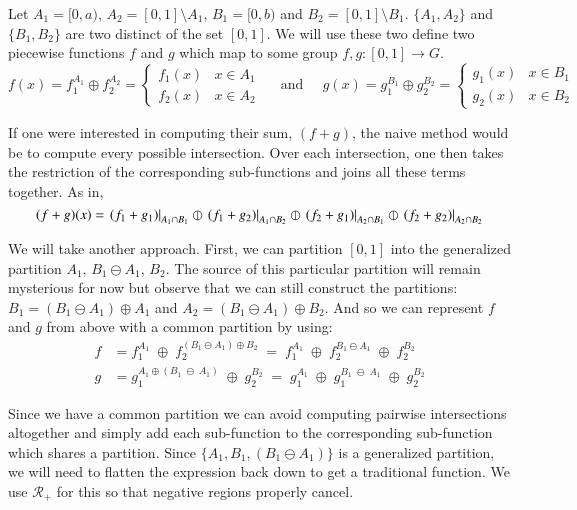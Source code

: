 Let $A_1 = [0,a)$, $A_2 = [0,1] \setminus A_1$, $B_1 = [0,b)$ and $B_2 = [0,1] \setminus B_1$.
$\{ A_1, A_2\}$ and $\{B_1, B_2\}$ are two distinct of the set $[0,1]$.
We will use these two define two piecewise functions $f$ and $g$ which map to some group $f,g:[0,1] \to G$.
\begin{equation*}
	f(x) = f_1^{A_1} \oplus f_2^{A_2}
		= \begin{cases}
			f_1(x) & x \in A_1 \\
			f_2(x) & x \in A_2
		\end{cases}
	\;\;\;\;\; \text{and} \;\;\;\;\;
	g(x) = g_1^{B_1} \oplus g_2^{B_2}
		= \begin{cases}
			g_1(x) & x \in B_1 \\
			g_2(x) & x \in B_2
		\end{cases}
\end{equation*}

If one were interested in computing their sum, $(f+g)$, the naive method would be to compute every possible intersection.
Over each intersection, one then takes the restriction of the corresponding sub-functions and joins all these terms together.
As in,
\begin{equation*}
	(f+g)(x) = \left.(f_1 + g_1)\right|_{A_1 \cap B_1} 
		\varobar \left.(f_1 + g_2)\right|_{A_1 \cap B_2} 
		\varobar \left.(f_2 + g_1)\right|_{A_2 \cap B_1}
		\varobar \left.(f_2 + g_2)\right|_{A_2 \cap B_2}
\end{equation*}

We will take another approach.
First, we can partition $[0,1]$ into the generalized partition $A_1$, $B_1 \ominus A_1$, $B_2$.
The source of this particular partition will remain mysterious for now but observe that we can still construct the partitions:
$B_1 = (B_1 \ominus A_1) \oplus A_1$ and $A_2 = (B_1 \ominus A_1) \oplus B_2$.
And so we can represent $f$ and $g$ from above with a common partition by using:
\begin{align*}
	f &=  f_1^{A_1} \;\oplus\; f_2^{(B_1 \ominus A_1) \oplus B_2}
		\;=\; f_1^{A_1} \;\oplus\; f_2^{B_1 \ominus A_1} \;\oplus\; f_2^{B_2} \\
	g &= g_1^{A_1 \oplus (B_1 \;\ominus\; A_1)} \;\oplus\; g_2^{B_2}
		\;=\; g_1^{A_1} \;\oplus\; g_1^{B_1 \;\ominus\; A_1} \;\oplus\; g_2^{B_2}
\end{align*}


Since we have a common partition we can avoid computing pairwise intersections altogether and simply add each 
sub-function to the corresponding sub-function which shares a partition.
Since $\{ A_1 , B_1, (B_1 \ominus A_1) \}$ is a generalized partition, we will need to flatten the expression back down
to get a traditional function.
We use $\mathcal{R}_+$ for this so that negative regions properly cancel. 

